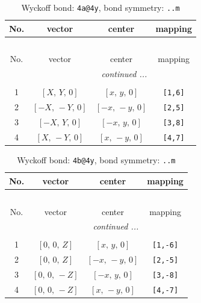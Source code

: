 \documentclass[fleqn,8pt]{jsarticle}
\begin{document}
\begin{longtable}{cccc}
\caption{Wyckoff bond: {\tt 4a@4y}, bond symmetry: {\tt ..m}}
 \\
 \hline \hline
No. & vector & center & mapping \\ \hline \endfirsthead

\multicolumn{3}{l}{\tablename\ \thetable{}} \\
 \hline \hline
No. & vector & center & mapping \\ \hline \endhead

 \hline \hline
\multicolumn{3}{r}{\footnotesize\it continued ...} \\ \endfoot

 \hline \hline
\multicolumn{3}{r}{} \\ \endlastfoot

1 & $\left[ X,\, Y,\, 0 \right]$ & $\left[ x,\, y,\, 0 \right]$ & {\tt [1,6]} \\ \hline
2 & $\left[ - X,\, - Y,\, 0 \right]$ & $\left[ - x,\, - y,\, 0 \right]$ & {\tt [2,5]} \\ \hline
3 & $\left[ - X,\, Y,\, 0 \right]$ & $\left[ - x,\, y,\, 0 \right]$ & {\tt [3,8]} \\ \hline
4 & $\left[ X,\, - Y,\, 0 \right]$ & $\left[ x,\, - y,\, 0 \right]$ & {\tt [4,7]} \\
\end{longtable}
\renewcommand{\arraystretch}{1.2}
\begin{longtable}{cccc}
\caption{Wyckoff bond: {\tt 4b@4y}, bond symmetry: {\tt ..m}}
 \\
 \hline \hline
No. & vector & center & mapping \\ \hline \endfirsthead

\multicolumn{3}{l}{\tablename\ \thetable{}} \\
 \hline \hline
No. & vector & center & mapping \\ \hline \endhead

 \hline \hline
\multicolumn{3}{r}{\footnotesize\it continued ...} \\ \endfoot

 \hline \hline
\multicolumn{3}{r}{} \\ \endlastfoot

1 & $\left[ 0,\, 0,\, Z \right]$ & $\left[ x,\, y,\, 0 \right]$ & {\tt [1,-6]} \\ \hline
2 & $\left[ 0,\, 0,\, Z \right]$ & $\left[ - x,\, - y,\, 0 \right]$ & {\tt [2,-5]} \\ \hline
3 & $\left[ 0,\, 0,\, - Z \right]$ & $\left[ - x,\, y,\, 0 \right]$ & {\tt [3,-8]} \\ \hline
4 & $\left[ 0,\, 0,\, - Z \right]$ & $\left[ x,\, - y,\, 0 \right]$ & {\tt [4,-7]} \\
\end{longtable}
\end{document}

